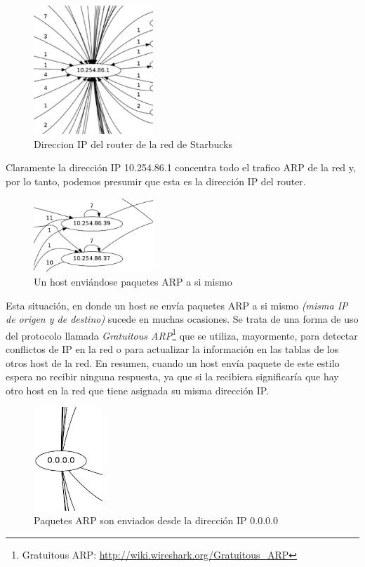 \begin{figure}[H]
  \centering
    \includegraphics[width=0.4\textwidth]{imagenes/starbucks/router.png}
  \caption{Direccion IP del router de la red de Starbucks}
  \label{fig:ejemplo}
\end{figure}

Claramente la dirección IP 10.254.86.1 concentra todo el trafico ARP de la red y, por lo tanto, podemos presumir que esta es la dirección IP del router.

\begin{figure}[H]
  \centering
    \includegraphics[width=0.4\textwidth]{imagenes/starbucks/loop.png}
  \caption{Un host enviándose paquetes ARP a si mismo}
  \label{fig:ejemplo}
\end{figure}

Esta situación, en donde un host se envía paquetes ARP a si mismo \textit{(misma IP de origen y de destino)} sucede en muchas ocasiones. Se trata de una forma de uso del protocolo llamada \textit{Gratuitous ARP}\footnote{Gratuitous ARP: \url{http://wiki.wireshark.org/Gratuitous_ARP}} que se utiliza, mayormente, para detectar conflictos de IP en la red o para actualizar la información en las tablas de los otros host de la red. En resumen, cuando un host envía paquete de este estilo espera no recibir ninguna respuesta, ya que si la recibiera significaría que hay otro host en la red que tiene asignada su misma dirección IP.

\begin{figure}[H]
  \centering
    \includegraphics[width=0.23\textwidth]{imagenes/starbucks/cerocero.png}
  \caption{Paquetes ARP son enviados desde la dirección IP 0.0.0.0}
  \label{fig:ejemplo}
\end{figure}

